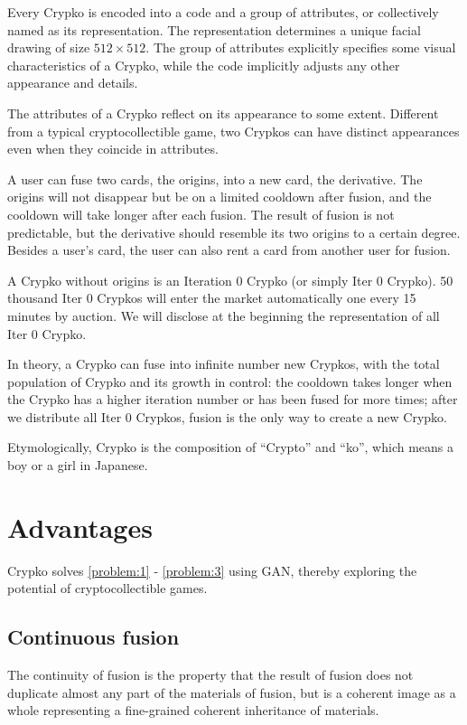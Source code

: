 \documentclass[a4paper]{article}
\begin{document}
Every Crypko is encoded into a code and a group of attributes, or collectively named as its representation. The representation determines a unique facial drawing of size $512 \times 512$. The group of attributes explicitly specifies some visual characteristics of a Crypko, while the code implicitly adjusts any other appearance and details.

The attributes of a Crypko reflect on its appearance to some extent. Different from a typical cryptocollectible game, two Crypkos can have distinct appearances even when they coincide in attributes.

A user can fuse two cards, the origins, into a new card, the derivative. The origins will not disappear but be on a limited cooldown after fusion, and the cooldown will take longer after each fusion. The result of fusion is not predictable, but the derivative should resemble its two origins to a certain degree. Besides a user's card, the user can also rent a card from another user for fusion.

A Crypko without origins is an Iteration 0 Crypko (or simply Iter 0 Crypko). 50 thousand Iter 0 Crypkos will enter the market automatically one every 15 minutes by auction. We will disclose at the beginning the representation of all Iter 0 Crypko.

In theory, a Crypko can fuse into infinite number new Crypkos, with the total population of Crypko and its growth in control: the cooldown takes longer when the Crypko has a higher iteration number or has been fused for more times; after we distribute all Iter 0 Crypkos, fusion is the only way to create a new Crypko.

Etymologically, Crypko is the composition of ``Crypto'' and ``ko'', which means a boy or a girl in Japanese.

\section{Advantages}

Crypko solves \ref{problem:1} - \ref{problem:3} using GAN, thereby exploring the potential of cryptocollectible games.

\subsection{Continuous fusion}

The continuity of fusion is the property that the result of fusion does not duplicate almost any part of the materials of fusion, but is a coherent image as a whole representing a fine-grained coherent inheritance of materials.
\end{document}
